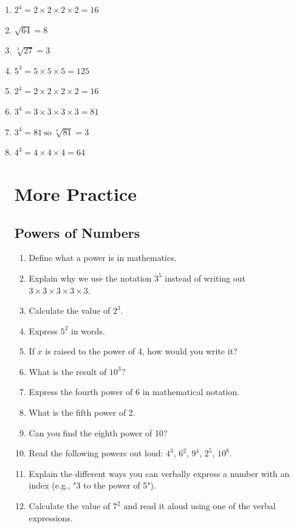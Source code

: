 \documentclass[12pt]{article}
\begin{document}
\begin{enumerate}
\item $2^4 = 2 \times 2 \times 2 \times 2 = 16$\\
\item $\sqrt{64} = 8$\\
\item $\sqrt[3]{27} = 3$\\
\item $5^3 = 5 \times 5 \times 5 = 125$\\
\item $2^4 = 2 \times 2 \times 2 \times 2 = 16$\\
\item $3^4 = 3 \times 3 \times 3 \times 3 = 81$\\
\item $3^4 = 81\ \text{so}\ \sqrt[4]{81} = 3$\\
\item $4^3 = 4 \times 4 \times 4 = 64$

\section*{More Practice}

\subsection*{Powers of Numbers}
\begin{enumerate}
\item Define what a power is in mathematics.
\item Explain why we use the notation $3^5$ instead of writing out $3 \times 3 \times 3 \times 3 \times 3$.
\item Calculate the value of $2^3$.
\item Express $5^2$ in words.
\item If $x$ is raised to the power of 4, how would you write it?
\item What is the result of $10^3$?
\item Express the fourth power of 6 in mathematical notation.
\item What is the fifth power of 2.
\item Can you find the eighth power of 10?
\item Read the following powers out loud: $4^3$, $6^2$, $9^4$, $2^5$, $10^8$.
\item Explain the different ways you can verbally express a number with an index (e.g., "3 to the power of 5").
\item Calculate the value of $7^2$ and read it aloud using one of the verbal expressions.
\end{enumerate}


\end{enumerate}
\end{document}
